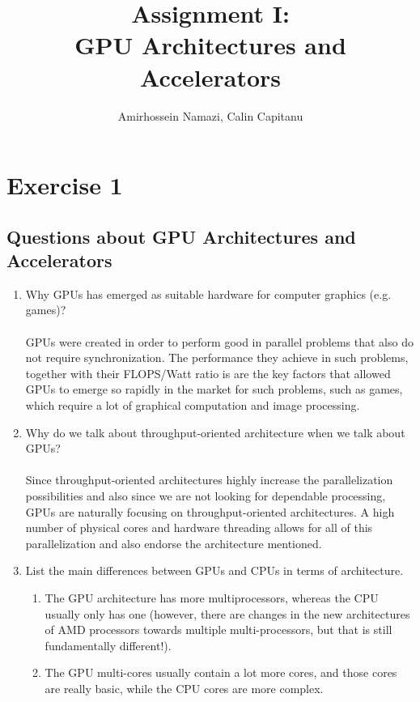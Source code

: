 \documentclass[english]{exam}
\begin{document}
\title{Assignment I:\\ GPU Architectures and Accelerators}
\author{Amirhossein Namazi, Calin Capitanu}

\maketitle


\chapter{Exercise 1}
\section*{Questions about GPU Architectures and Accelerators}

\begin{enumerate}
\item Why GPUs has emerged as suitable hardware for computer graphics (e.g. games)?\\\\
  GPUs were created in order to perform good in parallel problems that also do not require synchronization. The performance they achieve in such problems, together with their FLOPS/Watt ratio is are the key factors that allowed GPUs to emerge so rapidly in the market for such problems, such as games, which require a lot of graphical computation and image processing.
\item Why do we talk about throughput-oriented architecture when we talk about GPUs?\\\\
Since throughput-oriented architectures highly increase the parallelization possibilities and also since we are not looking for dependable processing, GPUs are naturally focusing on throughput-oriented architectures. A high number of physical cores and hardware threading allows for all of this parallelization and also endorse the architecture mentioned.  
\item List the main differences between GPUs and CPUs in terms of architecture.
  \begin{enumerate}
  \item The GPU architecture has more multiprocessors, whereas the CPU usually only has one (however, there are changes in the new architectures of AMD processors towards multiple multi-processors, but that is still fundamentally different!).
  \item The GPU multi-cores usually contain a lot more cores, and those cores are really basic, while the CPU cores are more complex.

\end{enumerate}
\end{enumerate}
\end{document}
